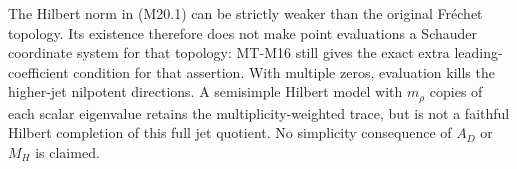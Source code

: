 The Hilbert norm in (M20.1) can be strictly weaker than
the original Fr\'echet topology. Its existence therefore
does not make point evaluations a Schauder coordinate
system for that topology: MT-M16 still gives the exact
extra leading-coefficient condition for that assertion.
With multiple zeros, evaluation kills the higher-jet
nilpotent directions. A semisimple Hilbert model with
\(m_\rho\) copies of each scalar eigenvalue retains
the multiplicity-weighted trace, but is not a faithful
Hilbert completion of this full jet quotient. No
simplicity consequence of \(A_D\) or \(M_H\) is claimed.
